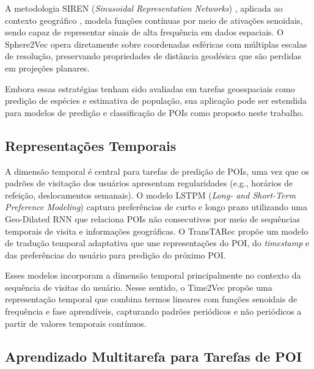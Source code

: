 A metodologia SIREN (\textit{Sinusoidal Representation Networks}) \cite{sitzmann2020implicit}, aplicada ao contexto geográfico \cite{rußwurm2024geographiclocationencodingspherical}, modela funções contínuas por meio de ativações senoidais, sendo capaz de representar sinais de alta frequência em dados espaciais. O Sphere2Vec \cite{mai2023sphere2vecgeneralpurposelocationrepresentation} opera diretamente sobre coordenadas esféricas com múltiplas escalas de resolução, preservando propriedades de distância geodésica que são perdidas em projeções planares.

Embora essas estratégias tenham sido avaliadas em tarefas geoespaciais como predição de espécies e estimativa de população, sua aplicação pode ser estendida para modelos de predição e classificação de POIs como proposto neste trabalho.

\subsection{Representações Temporais}

A dimensão temporal é central para tarefas de predição de POIs, uma vez que os padrões de visitação dos usuários apresentam regularidades (e.g., horários de refeição, deslocamentos semanais). O modelo LSTPM (\textit{Long- and Short-Term Preference Modeling}) \cite{sun2020go} captura preferências de curto e longo prazo utilizando uma Geo-Dilated RNN que relaciona POIs não consecutivos por meio de sequências temporais de visita e informações geográficas. O TransTARec \cite{sun2024transtarec} propõe um modelo de tradução temporal adaptativa que une representações do POI, do \textit{timestamp} e das preferências do usuário para predição do próximo POI.

Esses modelos incorporam a dimensão temporal principalmente no contexto da sequência de visitas do usuário. Nesse sentido, o Time2Vec \cite{kazemi2019time2vec} propõe uma representação temporal que combina termos lineares com funções senoidais de frequência e fase aprendíveis, capturando padrões periódicos e não periódicos a partir de valores temporais contínuos. 

\subsection{Aprendizado Multitarefa para Tarefas de POI}

